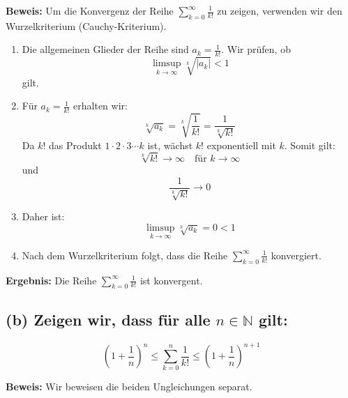 \documentclass[11pt]{article}
\begin{document}
\textbf{Beweis:} Um die Konvergenz der Reihe \(\sum_{k=0}^\infty \frac{1}{k!}\) zu zeigen, verwenden wir den Wurzelkriterium (Cauchy-Kriterium).

\begin{enumerate}
    \item Die allgemeinen Glieder der Reihe sind \(a_k = \frac{1}{k!}\). Wir prüfen, ob
    \[
    \limsup_{k \to \infty} \sqrt[k]{|a_k|} < 1
    \]
    gilt.

    \item Für \(a_k = \frac{1}{k!}\) erhalten wir:
    \[
    \sqrt[k]{a_k} = \sqrt[k]{\frac{1}{k!}} = \frac{1}{\sqrt[k]{k!}}
    \]
    Da \(k!\) das Produkt \(1 \cdot 2 \cdot 3 \cdots k\) ist, wächst \(k!\) exponentiell mit \(k\). Somit gilt:
    \[
    \sqrt[k]{k!} \to \infty \quad \text{für } k \to \infty
    \]
    und
    \[
    \frac{1}{\sqrt[k]{k!}} \to 0
    \]

    \item Daher ist:
    \[
    \limsup_{k \to \infty} \sqrt[k]{a_k} = 0 < 1
    \]

    \item Nach dem Wurzelkriterium folgt, dass die Reihe \(\sum_{k=0}^\infty \frac{1}{k!}\) konvergiert.
\end{enumerate}

\textbf{Ergebnis:} Die Reihe \(\sum_{k=0}^\infty \frac{1}{k!}\) ist konvergent.


\subsection*{(b) Zeigen wir, dass für alle \(n \in \mathbb{N}\) gilt:}
\[
\left( 1 + \frac{1}{n} \right)^n \leq \sum_{k=0}^n \frac{1}{k!} \leq \left( 1 + \frac{1}{n} \right)^{n+1}
\]

\textbf{Beweis:} Wir beweisen die beiden Ungleichungen separat.
\end{document}
